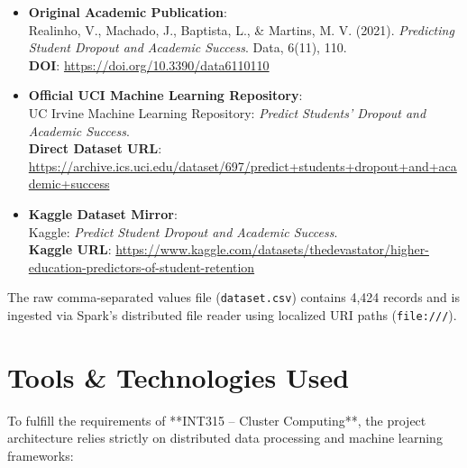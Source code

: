 \documentclass[11pt,a4paper]{article}
\begin{document}
\begin{itemize}
    \item \textbf{Original Academic Publication}: \\
    Realinho, V., Machado, J., Baptista, L., \& Martins, M. V. (2021). \textit{Predicting Student Dropout and Academic Success}. Data, 6(11), 110. \\
    \textbf{DOI}: \url{https://doi.org/10.3390/data6110110}
    
    \item \textbf{Official UCI Machine Learning Repository}: \\
    UC Irvine Machine Learning Repository: \textit{Predict Students' Dropout and Academic Success}. \\
    \textbf{Direct Dataset URL}: \url{https://archive.ics.uci.edu/dataset/697/predict+students+dropout+and+academic+success}
    
    \item \textbf{Kaggle Dataset Mirror}: \\
    Kaggle: \textit{Predict Student Dropout and Academic Success}. \\
    \textbf{Kaggle URL}: \url{https://www.kaggle.com/datasets/thedevastator/higher-education-predictors-of-student-retention}
\end{itemize}

The raw comma-separated values file (\texttt{dataset.csv}) contains 4,424 records and is ingested via Spark's distributed file reader using localized URI paths (\texttt{file:///}).

\section{Tools \& Technologies Used}
\label{sec:tools_technologies}

To fulfill the requirements of **INT315 -- Cluster Computing**, the project architecture relies strictly on distributed data processing and machine learning frameworks:
\end{document}
